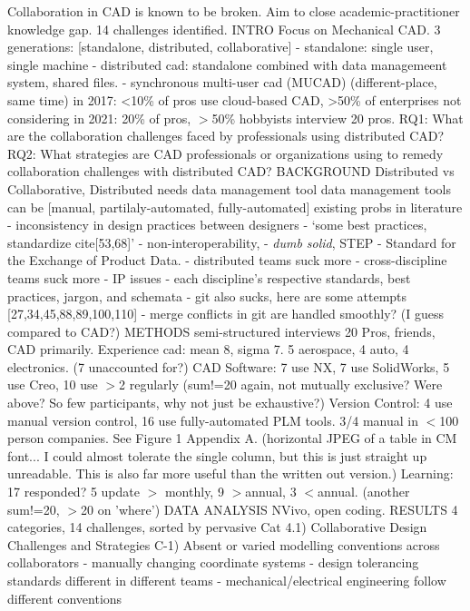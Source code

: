 \documentclass[journal,12pt,onecolumn,]{IEEEtran}
\begin{document}
Collaboration in CAD is known to be broken.
Aim to close academic-practitioner knowledge gap.
14 challenges identified.
INTRO
Focus on Mechanical CAD.
3 generations: [standalone, distributed, collaborative]
- standalone: single user, single machine
- distributed cad: standalone combined with data managemeent system, shared files.
- synchronous multi-user cad (MUCAD) (different-place, same time)
in 2017: \textless10\% of pros use cloud-based CAD, \textgreater50\% of enterprises not considering
in 2021: 20\% of pros, $>$50\% hobbyists
interview 20 pros.
RQ1: What are the collaboration challenges faced by professionals using distributed CAD?
RQ2: What strategies are CAD professionals or organizations using to remedy collaboration challenges with distributed CAD?
BACKGROUND
Distributed vs Collaborative, Distributed needs data management tool
data management tools can be [manual, partilaly-automated, fully-automated]
existing probs in literature
- inconsistency in design practices between designers
- `some best practices, standardize cite[53,68]'
- non-interoperability, 
- \textit{dumb solid}, STEP - Standard for the Exchange of Product Data.
- distributed teams suck more
- cross-discipline teams suck more
- IP issues
- each discipline's respective standards, best practices, jargon, and schemata
- git also sucks, here are some attempts [27,34,45,88,89,100,110]
- merge conflicts in git are handled smoothly? (I guess compared to CAD?)
METHODS
semi-structured interviews
20 Pros, friends, CAD primarily. Experience cad: mean 8, sigma 7.
5 aerospace, 4 auto, 4 electronics. (7 unaccounted for?)
CAD Software: 7 use NX, 7 use SolidWorks, 5 use Creo, 10 use $>$2 regularly (sum!=20 again, not mutually exclusive? Were above? So few participants, why not just be exhaustive?)
Version Control: 4 use manual version control, 16 use fully-automated PLM tools. 3/4 manual in $<$100 person companies.
See Figure 1 Appendix A. (horizontal JPEG of a table in CM font... I could almost tolerate the single column, but this is just straight up unreadable. This is also far more useful than the written out version.)
Learning: 17 responded? 5 update $>$ monthly, 9 $>$annual, 3 $<$annual. (another sum!=20, $>$20 on 'where')
DATA ANALYSIS
NVivo, open coding.
RESULTS
4 categories, 14 challenges, sorted by pervasive
Cat 4.1) Collaborative Design Challenges and Strategies
C-1) Absent or varied modelling conventions across collaborators
 - manually changing coordinate systems
 - design tolerancing standards different in different teams
 - mechanical/electrical engineering follow different conventions
\end{document}
